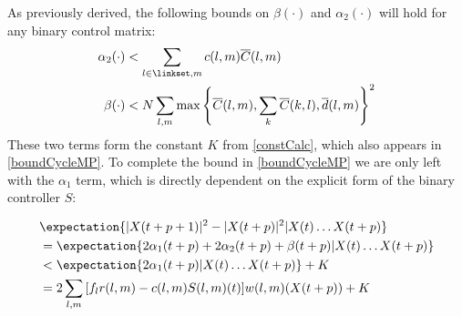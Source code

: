 As previously derived, the following bounds on $\beta(\cdot)$ and $\alpha_2(\cdot)$ will hold for any binary control matrix: 
\begin{align}
\label{a2bound_original} \alpha_2 (\cdot)&<  \sum_{l \in \linkset,m} c(l,m)\overline{C} (l,m) \\ 
\label{bbound_original} \beta (\cdot)  &<  N \displaystyle\sum_{l,m} \max\left\{ \overline{C}(l,m), \sum_{k} \overline{C}(k,l),  \overline d (l,m) \right\}^2
\end{align}
These two terms form the constant $K$ from \eqref{constCalc}, which also appears in \eqref{boundCycleMP}. To complete the bound in  \eqref{boundCycleMP} we are only left with the $\alpha_1$ term, which is directly dependent on the explicit form of the binary controller $S$:

\begin{align}
\nonumber
&\expectation{\vert X(t + p + 1)\vert^2 - \vert X(t + p)\vert^2 \vert X(t) \ldots X(t + p)} \\
\nonumber
& = \expectation{ 2\alpha_{1} (t+p) + 2\alpha_{2}(t+p) +\beta (t+p)    \vert  X(t) \ldots X(t + p)  }\\
\nonumber
&< \expectation{2\alpha_{1} (t+p) \vert X(t) \ldots X(t + p) } + K \\
&= 2\sum_{l,m} {[f_{l}r(l,m) - c(l,m)S(l,m)(t) ]w(l,m)(X(t + p))} + K \label{withK}
\end{align}


